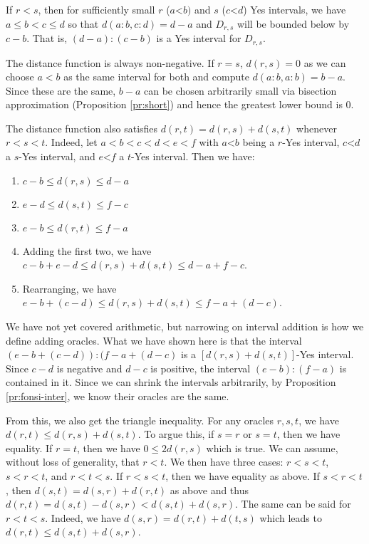 \documentclass[12pt]{article}
\theoremstyle{remark}
\newcommand{\lt}{\mathord{<}}
\begin{document}
If $r<s$, then for sufficiently small $r$ ($a\lt b)$ and $s$ ($c\lt d$) Yes intervals, we have $a\leq b<c \leq d$ so that $d(a:b,c:d) = d-a$ and $D_{r,s}$ will be bounded below by $c-b$. That is, $(d-a):(c-b)$ is a Yes interval for $D_{r,s}$.

The distance function is always non-negative. If $r=s$, $d(r,s)=0$ as we can choose $a<b$ as the same interval for both and compute $d(a:b,a:b)= b-a$. Since these are the same, $b-a$ can be chosen arbitrarily small via bisection approximation (Proposition \ref{pr:short}) and hence the greatest lower bound is 0. 

The distance function also satisfies $d(r,t) = d(r,s) + d(s,t)$ whenever $r < s < t$. Indeed, let $a<b<c<d<e<f$ with $a\lt b$ being a $r$-Yes interval, $c\lt d$ a $s$-Yes interval, and $e\lt f$ a $t$-Yes interval. Then we have: 
\begin{enumerate}
\item $c-b \leq d(r,s) \leq d-a$
\item $e-d \leq d(s,t) \leq f-c$
\item $e-b \leq d(r,t) \leq f-a$
\item Adding the first two, we have $c-b + e-d \leq d(r,s) + d(s,t) \leq d-a + f-c$.
\item Rearranging, we have $e-b + (c-d) \leq d(r,s) + d(s,t) \leq f-a + (d-c)$.
\end{enumerate}
We have not yet covered arithmetic, but narrowing on interval addition is how we define adding oracles. What we have shown here is that the interval $(e-b + (c-d)): (f-a + (d-c)$ is a $[d(r,s) + d(s,t)]$-Yes interval. Since $c-d$ is negative and $d-c$ is positive, the interval $(e-b):(f-a)$ is contained in it. Since we can shrink the intervals arbitrarily, by Proposition \ref{pr:fonsi-inter}, we know their oracles are the same. 

From this, we also get the triangle inequality. For any oracles $r, s, t$, we have $d(r,t) \leq d(r,s) + d(s,t)$.  To argue this, if $s = r$ or $s=t$, then we have equality. If $r=t$, then we have $0 \leq 2 d(r,s)$ which is true. We can assume, without loss of generality, that $r < t$. We then have three cases: $r< s< t$, $s < r < t$, and $r< t  < s$. If $r < s< t$, then we have equality as above. If $s < r < t$, then $d(s,t) = d(s,r) + d(r,t)$ as above and thus $d(r,t) = d(s,t) - d(s,r) < d(s,t) + d(s,r)$. The same can be said for $r < t < s$. Indeed,  we have $d(s,r) = d(r,t) + d(t,s)$ which leads to $d(r,t) \leq d(s,t) + d(s,r)$.
\end{document}

